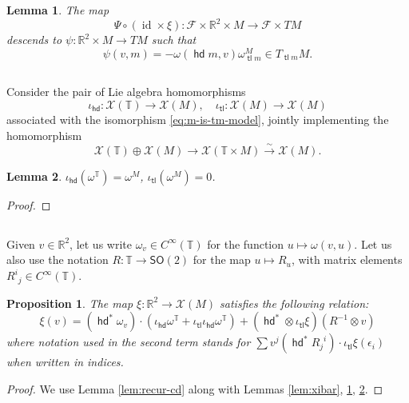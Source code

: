 \documentclass{amsart}
\def\RR{\mathbb{R}}
\def\TT{\mathbb{T}}
\def\XX{\mathscr{X}}
\def\sF{\mathscr{F}}
\DeclareMathOperator{\id}{\mathrm{id}}
\def\SO{\mathsf{SO}}
\DeclareMathOperator{\tail}{{\mathsf{tl}}}
\DeclareMathOperator{\head}{{\mathsf{hd}}}
\newtheorem{lem}{Lemma}
\newtheorem{prop}{Proposition}
\theoremstyle{definition}
\begin{document}
\begin{lem}\label{lem:psi}
        The map $$\Psi \circ (\id\times\xi) : \sF\times\RR^2\times M \to \sF\times TM$$
        descends to
        $ \psi : \RR^2 \times M \to TM $
        such that
        $$ \psi(v,m) = -\omega(\head m,v) \omega^M_{\tail m} \in T_{\tail m}M. $$
\end{lem}


\subsection{}Consider the pair of Lie algebra homomorphisms 
$$
\iota_{\head} : \XX(\TT) \to \XX(M),\quad \iota_{\tail} : \XX(M) \to \XX(M)
$$
associated with the isomorphism \eqref{eq:m-is-tm-model}, jointly implementing
the homomorphism
$$
\XX(\TT) \oplus \XX(M) \to \XX(\TT\times M)\xrightarrow{\sim} \XX(M).
$$
\begin{lem}\label{lem:head-equiv}
        $\iota_{\head}(\omega^\TT) = \omega^M$, $\iota_{\tail}(\omega^M)=0$.
\end{lem}
\begin{proof}\end{proof}

\subsection{}
Given $v \in \RR^2$, let us write $\omega_v \in C^\infty(\TT)$
for the function $u \mapsto \omega(v,u)$.
Let us also use the notation
$R : \TT \to \SO(2)$ for the map $u\mapsto R_u$,
with matrix elements ${R^i}_{j} \in C^\infty(\TT)$.
\begin{prop}\label{prop:recur-orig}
The map $\xi : \RR^2 \to \XX(M)$ satisfies the following relation:
$$
\xi(v) = (\head^*\omega_v) \cdot \left(\iota_{\head} \omega^\TT + \iota_{\tail} \iota_{\head} \omega^\TT\right)
+ (\head^* \otimes \iota_{\tail}\xi) (R^{-1}\otimes v)
 $$
 where notation used in the second term stands for
$\sum v^j (\head^*{R_j}^i) \cdot \iota_{\tail} \xi(\epsilon_i)$
when written in indices.
\end{prop}
\begin{proof}
        We use Lemma \ref{lem:recur-cd} along with Lemmas \ref{lem:xibar}, \ref{lem:psi}, \ref{lem:head-equiv}.
\end{proof}
\end{document}
